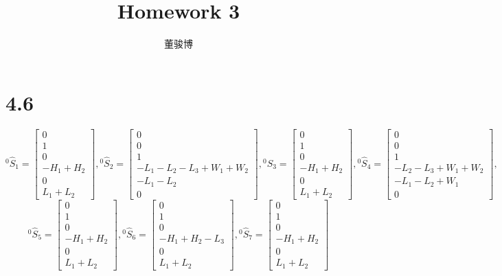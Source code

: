\documentclass[onecolumn,oneside]{SUSTechHomework}
\author{董骏博}
\title{Homework 3}
\begin{document}
  \maketitle
  \section*{4.6}
  \[
  {}^0\hat{S}_1 = \begin{bmatrix}
    0 \\ 1 \\ 0 \\ -H_1+H_2 \\ 0 \\ L_1+L_2
  \end{bmatrix},
  {}^0\hat{S}_2 = \begin{bmatrix}
    0 \\ 0 \\ 1 \\ -L_1-L_2-L_3+W_1+W_2 \\ -L_1-L_2 \\ 0
  \end{bmatrix},
  {}^0\hat{S}_3 = \begin{bmatrix}
    0 \\ 1 \\ 0 \\ -H_1+H_2 \\ 0 \\ L_1+L_2
  \end{bmatrix},
  {}^0\hat{S}_4 = \begin{bmatrix}
    0 \\ 0 \\ 1 \\ -L_2-L_3+W_1+W_2 \\ -L_1-L_2+W_1 \\ 0
  \end{bmatrix},
  \]
  \[
    {}^0\hat{S}_5 = \begin{bmatrix}
      0 \\ 1 \\ 0 \\ -H_1+H_2 \\ 0 \\ L_1+L_2
    \end{bmatrix},
    {}^0\hat{S}_6 = \begin{bmatrix}
      0 \\ 1 \\ 0 \\ -H_1+H_2-L_3 \\ 0 \\ L_1+L_2
    \end{bmatrix},
    {}^0\hat{S}_7 = \begin{bmatrix}
      0 \\ 1 \\ 0 \\ -H_1+H_2 \\ 0 \\ L_1+L_2
    \end{bmatrix}
  \]
\end{document}
